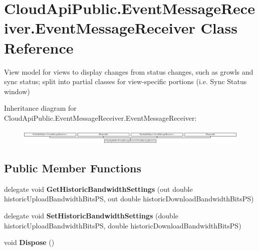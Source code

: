 \hypertarget{class_cloud_api_public_1_1_event_message_receiver_1_1_event_message_receiver}{\section{Cloud\-Api\-Public.\-Event\-Message\-Receiver.\-Event\-Message\-Receiver Class Reference}
\label{class_cloud_api_public_1_1_event_message_receiver_1_1_event_message_receiver}
}


View model for views to display changes from status changes, such as growls and sync status; split into partial classes for view-\/specific portions (i.\-e. Sync Status window)  


Inheritance diagram for Cloud\-Api\-Public.\-Event\-Message\-Receiver.\-Event\-Message\-Receiver\-:\begin{figure}[H]
\begin{center}
\leavevmode
\includegraphics[height=0.731071cm]{class_cloud_api_public_1_1_event_message_receiver_1_1_event_message_receiver}
\end{center}
\end{figure}
\subsection*{Public Member Functions}
\begin{DoxyCompactItemize}
\item 
\hypertarget{class_cloud_api_public_1_1_event_message_receiver_1_1_event_message_receiver_a68dbda3ee375a1c953c3a3e4fe5a8334}{delegate void {\bfseries Get\-Historic\-Bandwidth\-Settings} (out double historic\-Upload\-Bandwidth\-Bits\-P\-S, out double historic\-Download\-Bandwidth\-Bits\-P\-S)}\label{class_cloud_api_public_1_1_event_message_receiver_1_1_event_message_receiver_a68dbda3ee375a1c953c3a3e4fe5a8334}

\item 
\hypertarget{class_cloud_api_public_1_1_event_message_receiver_1_1_event_message_receiver_afd8ef0a309c7f9e241c8bbc244b819a2}{delegate void {\bfseries Set\-Historic\-Bandwidth\-Settings} (double historic\-Upload\-Bandwidth\-Bits\-P\-S, double historic\-Download\-Bandwidth\-Bits\-P\-S)}\label{class_cloud_api_public_1_1_event_message_receiver_1_1_event_message_receiver_afd8ef0a309c7f9e241c8bbc244b819a2}

\item 
\hypertarget{class_cloud_api_public_1_1_event_message_receiver_1_1_event_message_receiver_aec1cf65af718c9bc660ae7eb1b48dabf}{void {\bfseries Dispose} ()}\label{class_cloud_api_public_1_1_event_message_receiver_1_1_event_message_receiver_aec1cf65af718c9bc660ae7eb1b48dabf}

\end{DoxyCompactItemize}
